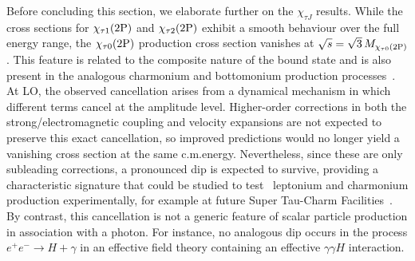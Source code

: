 Before concluding this section, we elaborate further on the $\chi_{\tau J}$ results.
While the cross sections for $\chi_{\tau 1}(2\mathrm{P})$ and $\chi_{\tau 2}(2\mathrm{P})$ exhibit a smooth behaviour over the full energy range, the $\chi_{\tau 0}(2\mathrm{P})$ production cross section vanishes at $\sqrt{s}=\sqrt{3}\,M_{\chi_{\tau 0}(2\mathrm{P})}$. This feature is related to the composite nature of the bound state and is also present in the analogous charmonium and bottomonium production processes~\cite{Chung:2008km,Li:2009ki,Sang:2009jc,Xu:2014zra,Brambilla:2017kgw}. At LO, the observed cancellation arises from a dynamical mechanism in which different terms cancel at the amplitude level. Higher-order corrections in both the strong/electromagnetic coupling and velocity expansions are not expected to preserve this exact cancellation, so improved predictions would no longer yield a vanishing cross section at the same c.m.\@ energy. Nevertheless, since these are only subleading corrections, a pronounced dip is expected to survive, providing a characteristic signature that could be studied to test \pwavetxt\ leptonium and charmonium production experimentally, for example at future Super Tau-Charm Facilities~\cite{Achasov:2023gey,SCTF_CDR_PhysicsDetector_2018}. By contrast, this cancellation is not a generic feature of scalar particle production in association with a photon. For instance, no analogous dip occurs in the process $e^+e^-\to H+\gamma$ in an effective field theory containing an effective $\gamma\gamma H$ interaction. 